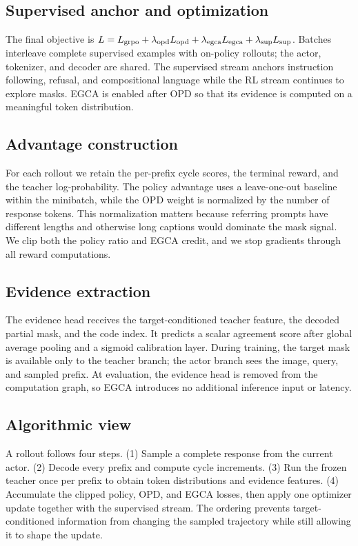 \documentclass{article}
\begin{document}
\subsection{Supervised anchor and optimization}The final objective is $L=L_{\rm grpo}+\lambda_{\rm opd}L_{\rm opd}+\lambda_{\rm egca}L_{\rm egca}+\lambda_{\rm sup}L_{\rm sup}$. Batches interleave complete supervised examples with on-policy rollouts; the actor, tokenizer, and decoder are shared. The supervised stream anchors instruction following, refusal, and compositional language while the RL stream continues to explore masks. EGCA is enabled after OPD so that its evidence is computed on a meaningful token distribution.
\subsection{Advantage construction}For each rollout we retain the per-prefix cycle scores, the terminal reward, and the teacher log-probability. The policy advantage uses a leave-one-out baseline within the minibatch, while the OPD weight is normalized by the number of response tokens. This normalization matters because referring prompts have different lengths and otherwise long captions would dominate the mask signal. We clip both the policy ratio and EGCA credit, and we stop gradients through all reward computations.
\subsection{Evidence extraction}The evidence head receives the target-conditioned teacher feature, the decoded partial mask, and the code index. It predicts a scalar agreement score after global average pooling and a sigmoid calibration layer. During training, the target mask is available only to the teacher branch; the actor branch sees the image, query, and sampled prefix. At evaluation, the evidence head is removed from the computation graph, so EGCA introduces no additional inference input or latency.
\subsection{Algorithmic view}A rollout follows four steps. (1) Sample a complete response from the current actor. (2) Decode every prefix and compute cycle increments. (3) Run the frozen teacher once per prefix to obtain token distributions and evidence features. (4) Accumulate the clipped policy, OPD, and EGCA losses, then apply one optimizer update together with the supervised stream. The ordering prevents target-conditioned information from changing the sampled trajectory while still allowing it to shape the update.
\end{document}
